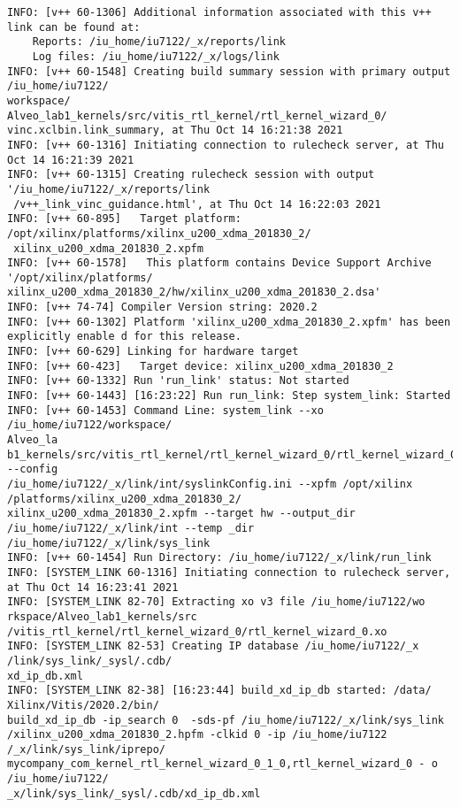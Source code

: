\begin{lstlisting}[label=some-code-2,caption=Содержимое файла v++\_vinc.log]
INFO: [v++ 60-1306] Additional information associated with this v++ link can be found at:
	Reports: /iu_home/iu7122/_x/reports/link
	Log files: /iu_home/iu7122/_x/logs/link
INFO: [v++ 60-1548] Creating build summary session with primary output /iu_home/iu7122/
workspace/ Alveo_lab1_kernels/src/vitis_rtl_kernel/rtl_kernel_wizard_0/
vinc.xclbin.link_summary, at Thu Oct 14 16:21:38 2021
INFO: [v++ 60-1316] Initiating connection to rulecheck server, at Thu Oct 14 16:21:39 2021
INFO: [v++ 60-1315] Creating rulecheck session with output '/iu_home/iu7122/_x/reports/link
 /v++_link_vinc_guidance.html', at Thu Oct 14 16:22:03 2021
INFO: [v++ 60-895]   Target platform: /opt/xilinx/platforms/xilinx_u200_xdma_201830_2/
 xilinx_u200_xdma_201830_2.xpfm
INFO: [v++ 60-1578]   This platform contains Device Support Archive '/opt/xilinx/platforms/ 
xilinx_u200_xdma_201830_2/hw/xilinx_u200_xdma_201830_2.dsa'
INFO: [v++ 74-74] Compiler Version string: 2020.2
INFO: [v++ 60-1302] Platform 'xilinx_u200_xdma_201830_2.xpfm' has been explicitly enable d for this release.
INFO: [v++ 60-629] Linking for hardware target
INFO: [v++ 60-423]   Target device: xilinx_u200_xdma_201830_2
INFO: [v++ 60-1332] Run 'run_link' status: Not started
INFO: [v++ 60-1443] [16:23:22] Run run_link: Step system_link: Started
INFO: [v++ 60-1453] Command Line: system_link --xo /iu_home/iu7122/workspace/
Alveo_la b1_kernels/src/vitis_rtl_kernel/rtl_kernel_wizard_0/rtl_kernel_wizard_0.xo --config 
/iu_home/iu7122/_x/link/int/syslinkConfig.ini --xpfm /opt/xilinx /platforms/xilinx_u200_xdma_201830_2/
xilinx_u200_xdma_201830_2.xpfm --target hw --output_dir /iu_home/iu7122/_x/link/int --temp _dir /iu_home/iu7122/_x/link/sys_link
INFO: [v++ 60-1454] Run Directory: /iu_home/iu7122/_x/link/run_link 
INFO: [SYSTEM_LINK 60-1316] Initiating connection to rulecheck server, at Thu Oct 14 16:23:41 2021
INFO: [SYSTEM_LINK 82-70] Extracting xo v3 file /iu_home/iu7122/wo rkspace/Alveo_lab1_kernels/src
/vitis_rtl_kernel/rtl_kernel_wizard_0/rtl_kernel_wizard_0.xo
INFO: [SYSTEM_LINK 82-53] Creating IP database /iu_home/iu7122/_x /link/sys_link/_sysl/.cdb/
xd_ip_db.xml
INFO: [SYSTEM_LINK 82-38] [16:23:44] build_xd_ip_db started: /data/ Xilinx/Vitis/2020.2/bin/
build_xd_ip_db -ip_search 0  -sds-pf /iu_home/iu7122/_x/link/sys_link
/xilinx_u200_xdma_201830_2.hpfm -clkid 0 -ip /iu_home/iu7122 /_x/link/sys_link/iprepo/
mycompany_com_kernel_rtl_kernel_wizard_0_1_0,rtl_kernel_wizard_0 - o /iu_home/iu7122/
_x/link/sys_link/_sysl/.cdb/xd_ip_db.xml

\end{lstlisting}
